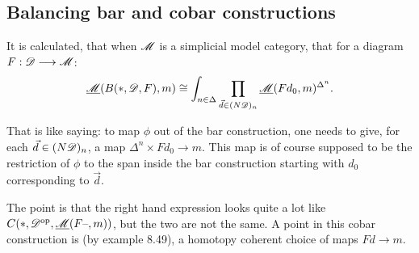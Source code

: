 \documentclass[11pt]{article}
\begin{document}
\begin{8. Weighted limits and colimits}
\subsection*{Balancing bar and cobar constructions}
It is calculated, that when $\mathscr{M}$ is a simplicial model category, that for a diagram $F:\mathscr{D}\longrightarrow\mathscr{M}$:
\[\underline{\mathscr{M}}(B(*,\mathscr{D},F),m)\cong \int_{n\in\Delta}\prod_{\vec d\in (N\mathscr{D})_n}\underline{\mathscr{M}}(Fd_0,m)^{\Delta^n}.\]
\begin{shaded}
That is like saying: to map $\phi$ out of the bar construction, one needs to give, for each $\vec d\in (N\mathscr{D})_n$, a map $\Delta^n\times Fd_0\to m$. This map is of course supposed to be the restriction of $\phi$ to the span inside the bar construction starting with $d_0$ corresponding to $\vec d$. 
\end{shaded}
\noindent The point is that the right hand expression looks quite a lot like $C(*,\mathscr{D}^{\textup{op}},\underline{\mathscr{M}}(F\textup{--} ,m))$, but the two are not the same. A point in this cobar construction is (by example 8.49), a homotopy coherent choice of maps $Fd\to m$.
\end{8. Weighted limits and colimits}
\end{document}
